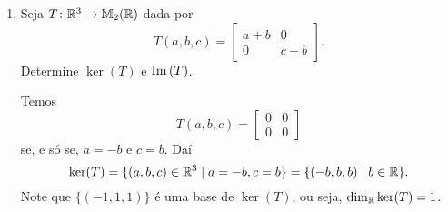 \begin{exemplos}
    \begin{enumerate}[label={\arabic*})]
        \item Seja $T \colon \mathbb{R}^3 \to \mathbb{M}_2(\mathbb{R})$ dada por
        \[
            T(a,b,c) = \begin{bmatrix}
                a + b & 0\\
                0 & c - b
            \end{bmatrix}.
        \]
        Determine $\ker(T)$ e ${\rm Im\,}(T)$.
        \begin{solucao}
            Temos
            \[
                T(a,b,c) = \begin{bmatrix}
                0 & 0\\
                0 & 0
                \end{bmatrix}
            \]
            se, e só se, $a = -b$ e $c = b$. Daí
            \[
                \ker(T) = \{(a,b,c) \in \mathbb{R}^3 \mid a = -b, c = b\} = \{(-b,b,b) \mid b \in \mathbb{R}\}.
            \]
            Note que $\{(-1,1,1)\}$ é uma base de $\ker(T)$, ou seja, $\dim_{\mathbb{R}} \ker(T) = 1$.


\end{solucao}
\end{enumerate}
\end{exemplos}
